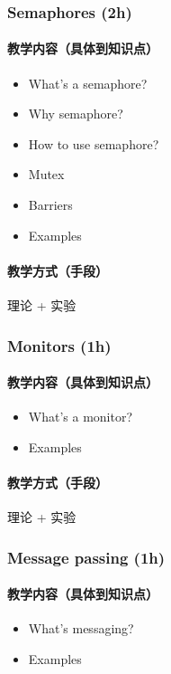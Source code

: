 \documentclass[11pt]{article}
\begin{document}
\subsubsection{Semaphores (2h)}
\label{sec-3-2-4}
\paragraph{教学内容（具体到知识点）}
\label{sec-3-2-4-1}
\begin{itemize}
\item What's a semaphore?
\item Why semaphore?
\item How to use semaphore?
\item Mutex
\item Barriers
\item Examples
\end{itemize}
\paragraph{教学方式（手段）}
\label{sec-3-2-4-2}
理论 + 实验
\subsubsection{Monitors (1h)}
\label{sec-3-2-5}
\paragraph{教学内容（具体到知识点）}
\label{sec-3-2-5-1}
\begin{itemize}
\item What's a monitor?
\item Examples
\end{itemize}
\paragraph{教学方式（手段）}
\label{sec-3-2-5-2}
理论 + 实验
\subsubsection{Message passing (1h)}
\label{sec-3-2-6}
\paragraph{教学内容（具体到知识点）}
\label{sec-3-2-6-1}
\begin{itemize}
\item What's messaging?
\item Examples
\end{itemize}
\end{document}
